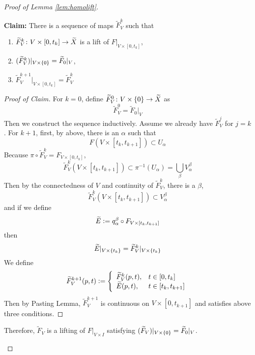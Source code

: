 \begin{enumerate}[label=\arabic{*}.]
\begin{proof}[Proof of Lemma \ref{lem:homolift}]
\begin{enumerate}[label=\Roman*.]
			\noindent \textbf{Claim:} There is a sequence of maps $\widetilde{F}_V^k$ such that
			\begin{enumerate}[label=(\roman*)]
				\item $\widetilde{F}_V^k \colon V \times [0,t_k] \rightarrow \widetilde{X}$ is a lift of $F|_{V \times [0,t_k]}$,
				\item $(\widetilde{F}_V^k)|_{V \times \left\{0\right\}} = \widetilde{F}_0|_{V}$,
				\item $\widetilde{F}_V^{k+1}|_{V \times [0,t_k]} = \widetilde{F}_V^k$
			\end{enumerate}
			\begin{proof}[Proof of Claim]
				For $k = 0$, define $\widetilde{F}_V^0 \colon V \times \left\{0\right\} \rightarrow \widetilde{X}$ as
				\begin{equation*}
					\widetilde{F}_V^0 = \widetilde{F}_0|_{V}
				\end{equation*}
				Then we construct the sequence inductively. Assume we already have $\widetilde{F}_V^j$ for $j=k$. For $k+1$, first, by above, there is an $\alpha$ such that
				\begin{equation*}
					F(V \times [t_k,t_{k+1}]) \subset U_{\alpha}
				\end{equation*}
				Because $\pi \circ \widetilde{F}_V^k = F_{V \times [0,t_k]}$,
				\begin{equation*}
					\widetilde{F}_V^k(V \times [t_k,t_{k+1}]) \subset \pi^{-1}(U_{\alpha}) = \bigcup_\beta V_\alpha^\beta
				\end{equation*}
				Then by the connectedness of $V$ and continuity of $\widetilde{F}_V^k$, there is a $\beta$,
				\begin{equation*}
					\widetilde{F}_V^k(V \times [t_k,t_{k+1}]) \subset V_\alpha^\beta
				\end{equation*}
				and if we define
				\begin{equation*}
					\widetilde{E} \vcentcolon= q_{\alpha}^\beta \circ F_{V \times [t_k,t_{k+1}]}
				\end{equation*}
				then 
				\begin{equation*}
					\widetilde{E}|_{V \times \left\{t_k\right\}} = \widetilde{F}_V^k|_{V \times \left\{t_k\right\}}
				\end{equation*}
				We define
				\begin{equation*}
					\widetilde{F}_V^{k+1}(p,t) \vcentcolon= \left\{
						\begin{array}{ll}
							\widetilde{F}_V^k(p,t),& t \in [0,t_k] \\
							\widetilde{E}(p,t),& t \in [t_k,t_{k+1}]
						\end{array}
					\right.
				\end{equation*}
				Then by Pasting Lemma, $\widetilde{F}_V^{k+1}$ is continuous on $V \times [0,t_{k+1}]$ and satisfies above three conditions. 
			\end{proof}
			Therefore, $\widetilde{F}_V$ is a lifting of $F|_{V \times I}$ satisfying $(\widetilde{F}_V)|_{V \times \left\{0\right\}} = \widetilde{F}_0|_{V}$.


\end{enumerate}
\end{proof}
\end{enumerate}
